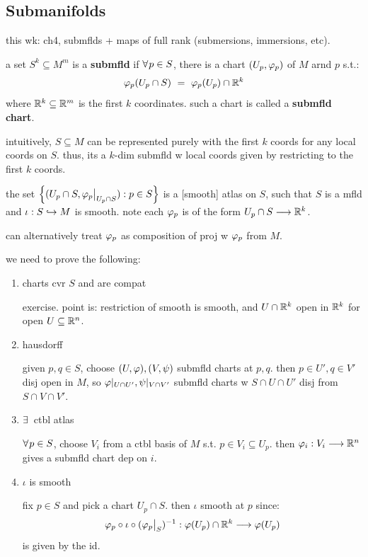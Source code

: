 \subsection{Submanifolds}


this wk: ch4, submflds + maps of full rank (submersions, immersions, etc).

\begin{defn}
	a set $S^{k}\subseteq M^{m}$ is a \textbf{submfld} if $\fa p\in S$,
	there is a chart $(U_{p},\varphi_{p})$ of $M$ arnd $p$ s.t.:
	\begin{equation*}
		\vphi_{p}(U_{p}\cap S) \ = \ \vphi_{p}(U_{p})\cap\bR^{k}
	\end{equation*}
	where $\mathbb{R}^{k}\subseteq\mathbb{R}^{m}$ is the first $k$ coordinates.
	such a chart is called a \textbf{submfld chart}.
\end{defn}
intuitively, $S\subseteq M$ can be represented purely with the first $k$ coords
for any local coords on $S$. thus, its a $k$-dim submfld w local coords given by
restricting to the first $k$ coords.

\begin{prop}
	the set $\left\{{(U_{p}\cap S,\varphi_{p}\big\rvert_{U_{p}\cap S}):p\in S}\right\}$ is
	a [smooth] atlas on $S$, such that $S$ is a mfld and $\iota:S\hookrightarrow M$ is smooth.
	note each $\varphi_{p}$ is of the form $U_{p}\cap S\longrightarrow\mathbb{R}^{k}$.
\end{prop}
can alternatively treat $\varphi_{p}$ as composition of proj w $\varphi_{p}$ from $M$.

\begin{pf}[source=Primary Source Material]
	we need to prove the following:
	\begin{enumerate}[(1)]
		\item charts cvr $S$ and are compat

			exercise. point is: restriction of smooth is smooth, and
			$U\cap\mathbb{R}^{k}$ open in $\mathbb{R}^{k}$ for open $U\subseteq\mathbb{R}^{n}$.

		\item hausdorff

			given $p,q\in S$, choose $(U,\varphi),(V,\psi)$ submfld charts at $p,q$.
			then $p\in U',q\in V'$ disj open in $M$, so $\varphi\rvert_{U\cap U'},\psi\rvert_{V\cap V'}$
			submfld charts w $S\cap U\cap U'$ disj from $S\cap V\cap V'$.

		\item $\ex$ ctbl atlas

			$\fa p\in S$, choose $V_{i}$ from a ctbl basis of $M$ s.t.
			$p\in V_{i}\subseteq U_{p}$. then $\varphi_{i}:V_{i}\longrightarrow\mathbb{R}^{n}$
			gives a submfld chart dep on $i$.

		\item $\iota$ is smooth

			fix $p\in S$ and pick a chart $U_{p}\cap S$. then $\iota$ smooth at $p$ since:
			\begin{equation*}
				\varphi_{p}\circ\iota\circ(\varphi_{p}\big\rvert_{S})^{-1} :
				\varphi(U_{p})\cap\mathbb{R}^{k}\longrightarrow\varphi(U_{p})
			\end{equation*}
			is given by the id.
	\end{enumerate}
\end{pf} \

